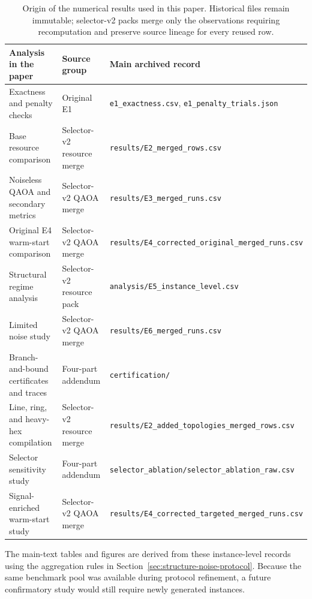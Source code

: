 \documentclass[a4paper,onecolumn,11pt,unpublished]{quantumarticle}
\theoremstyle{remark}
\begin{document}
\begin{table}[!htbp]
\centering
\small
\caption{Origin of the numerical results used in this paper. Historical files
remain immutable; selector-v2 packs merge only the observations requiring
recomputation and preserve source lineage for every reused row.}
\label{tab:result-provenance}

\begin{tabular}{@{}>{\raggedright\arraybackslash}p{.20\linewidth}>{\raggedright\arraybackslash}p{.24\linewidth}>{\raggedright\arraybackslash}p{.48\linewidth}@{}}
\toprule
Analysis in the paper & Source group & Main archived record \\
\midrule
Exactness and penalty checks & Original E1 & \nolinkurl{e1_exactness.csv}, \nolinkurl{e1_penalty_trials.json} \\
Base resource comparison & Selector-v2 resource merge & \nolinkurl{results/E2_merged_rows.csv} \\
Noiseless QAOA and secondary metrics & Selector-v2 QAOA merge & \nolinkurl{results/E3_merged_runs.csv} \\
Original E4 warm-start comparison & Selector-v2 QAOA merge & \nolinkurl{results/E4_corrected_original_merged_runs.csv} \\
Structural regime analysis & Selector-v2 resource pack & \nolinkurl{analysis/E5_instance_level.csv} \\
Limited noise study & Selector-v2 QAOA merge & \nolinkurl{results/E6_merged_runs.csv} \\
Branch-and-bound certificates and traces & Four-part addendum & \nolinkurl{certification/} \\
Line, ring, and heavy-hex compilation & Selector-v2 resource merge & \nolinkurl{results/E2_added_topologies_merged_rows.csv} \\
Selector sensitivity study & Four-part addendum & \nolinkurl{selector_ablation/selector_ablation_raw.csv} \\
Signal-enriched warm-start study & Selector-v2 QAOA merge & \nolinkurl{results/E4_corrected_targeted_merged_runs.csv} \\
\bottomrule
\end{tabular}
\end{table}

The main-text tables and figures are derived from these instance-level records
using the aggregation rules in Section~\ref{sec:structure-noise-protocol}.
Because the
same benchmark pool was available during protocol refinement, a future
confirmatory study would still require newly generated instances.
\end{document}
